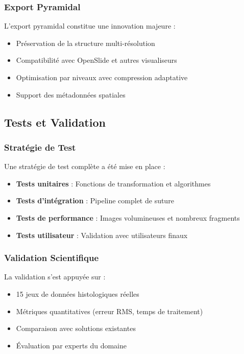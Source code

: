 \documentclass[12pt,a4paper]{article}
\begin{document}
\subsubsection{Export Pyramidal}

L'export pyramidal constitue une innovation majeure :
\begin{itemize}
\item Préservation de la structure multi-résolution
\item Compatibilité avec OpenSlide et autres visualiseurs
\item Optimisation par niveaux avec compression adaptative
\item Support des métadonnées spatiales
\end{itemize}

\subsection{Tests et Validation}

\subsubsection{Stratégie de Test}

Une stratégie de test complète a été mise en place :

\begin{itemize}
\item \textbf{Tests unitaires} : Fonctions de transformation et algorithmes
\item \textbf{Tests d'intégration} : Pipeline complet de suture
\item \textbf{Tests de performance} : Images volumineuses et nombreux fragments
\item \textbf{Tests utilisateur} : Validation avec utilisateurs finaux
\end{itemize}

\subsubsection{Validation Scientifique}

La validation s'est appuyée sur :
\begin{itemize}
\item 15 jeux de données histologiques réelles
\item Métriques quantitatives (erreur RMS, temps de traitement)
\item Comparaison avec solutions existantes
\item Évaluation par experts du domaine
\end{itemize}
\end{document}
